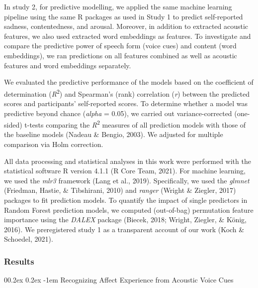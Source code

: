 \documentclass[
  man,floatsintext]{apa6}
\makeatletter
\let\oldparagraph\paragraph
\renewcommand{\paragraph}[1]{\oldparagraph{#1}\mbox{}}
\renewcommand{\paragraph}{\@startsection{paragraph}{4}{\parindent}%
  {0\baselineskip \@plus 0.2ex \@minus 0.2ex}%
  {-1em}%
  {\normalfont\normalsize\bfseries\itshape\typesectitle}}
\makeatother
\begin{document}
In study 2, for predictive modelling, we applied the same machine learning pipeline using the same R packages as used in Study 1 to predict self-reported sadness, contentedness, and arousal. Moreover, in addition to extracted acoustic features, we also used extracted word embeddings as features. To investigate and compare the predictive power of speech form (voice cues) and content (word embeddings), we ran predictions on all features combined as well as acoustic features and word embeddings separately.

We evaluated the predictive performance of the models based on the coefficient of determination (\emph{R}\textsuperscript{2}) and Spearman's (rank) correlation (\emph{r}) between the predicted scores and participants' self-reported scores. To determine whether a model was predictive beyond chance (\emph{alpha} = 0.05), we carried out variance-corrected (one-sided) t-tests comparing the \emph{R}\textsuperscript{2} measures of all prediction models with those of the baseline models (Nadeau \& Bengio, 2003). We adjusted for multiple comparison via Holm correction.

All data processing and statistical analyses in this work were performed with the statistical software R version 4.1.1 (R Core Team, 2021). For machine learning, we used the \emph{mlr3} framework (Lang et al., 2019). Specifically, we used the \emph{glmnet} (Friedman, Hastie, \& Tibshirani, 2010) and \emph{ranger} (Wright \& Ziegler, 2017) packages to fit prediction models. To quantify the impact of single predictors in Random Forest prediction models, we computed (out-of-bag) permutation feature importance using the \emph{DALEX} package (Biecek, 2018; Wright, Ziegler, \& König, 2016). We preregistered study 1 as a transparent account of our work (Koch \& Schoedel, 2021).

\hypertarget{results}{%
\subsubsection{Results}\label{results}}

\hypertarget{recognizing-affect-experience-from-acoustic-voice-cues}{%
\paragraph{Recognizing Affect Experience from Acoustic Voice Cues}\label{recognizing-affect-experience-from-acoustic-voice-cues}}
\end{document}
